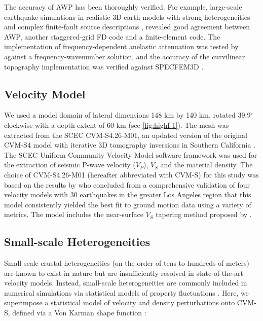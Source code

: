 The accuracy of AWP has been thoroughly verified. For example, large-scale earthquake simulations in realistic 3D earth models with strong heterogeneities and complex finite-fault source descriptions \citep{bielakShakeOutEarthquakeScenario2010,bielak2016verification}, revealed good agreement between AWP, another staggered-grid FD code and a finite-element code. 
The implementation of frequency-dependent anelastic attenuation was tested by \citet{withersMemoryEfficientSimulation2015} against a frequency-wavenumber solution, and the accuracy of the curvilinear topography implementation \citep{oreillyHighorderFiniteDifference2021} was verified against SPECFEM3D \citep{komatitschSpectralelementSimulationsGlobal2002}.


\subsection{Velocity Model}
We used a model domain of lateral dimensions 148 km by 140 km, rotated 39.9$^{\circ}$ clockwise with a depth extent of 60 km (see \cref{fig:highf-1}). The mesh was extracted from the SCEC CVM-S4.26-M01, an updated version of the original CVM-S4 model \citep{magistraleSCECSouthernCalifornia2000,kohlerMantleHeterogeneitiesSCEC2003} with iterative 3D tomography inversions in Southern California \citep{leeRapidFullwaveCentroid2011}. The SCEC Uniform Community Velocity Model software framework \citep[V19.4; ][]{smallSCECUnifiedCommunity2017} was used for the extraction of seismic P-wave velocity ($V_P$), $V_S$ and the material density. The choice of CVM-S4.26-M01 (hereafter abbreviated with CVM-S) for this study was based on the results by \citet{tabordaEvaluationSouthernCalifornia2016} who concluded from a comprehensive validation of four velocity models with 30 earthquakes in the greater Los Angeles region that this model consistently yielded the best fit to ground motion data using a variety of metrics. The model includes the near-surface $V_S$ tapering method proposed by \citet{huCalibrationNearsurfaceSeismic2021}.

\subsection{Small-scale Heterogeneities}
Small-scale crustal heterogeneities (on the order of tens to hundreds of meters) are known to exist in nature  but are insufficiently resolved in state-of-the-art velocity models. Instead, small-scale heterogeneities are commonly included in numerical simulations via statistical models of property fluctuations . Here, we superimpose a statistical model of velocity and density perturbations onto CVM-S, defined via a Von Karman shape function \citep{frankelFiniteDifferenceSimulations1986}:

